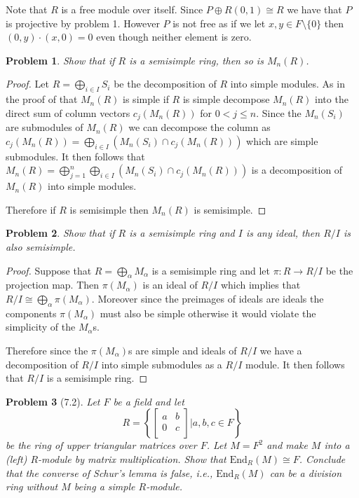 \documentclass[10pt]{article}
\newcommand{\sk}{\vskip 10mm}
\theoremstyle{plain}
\newtheorem{problem}{Problem}
\theoremstyle{remark}
\begin{document}
Note that $R$ is a free module over itself. Since $P\oplus R(0,1)\cong R$
we have that $P$ is projective by problem 1. However $P$ is
not free as if we let $x,y\in F\setminus\{0\}$ then $(0,y)\cdot(x,0)=0$ even
though neither element is zero.

\sk

\begin{problem}
  Show that if $R$ is a semisimple ring, then so is $M_n(R)$.
\end{problem}

\begin{proof}
  Let $R=\bigoplus_{i\in I}S_i$ be the decomposition of $R$ into simple modules.
  As in the proof of that $M_n(R)$ is simple if $R$ is simple decompose
  $M_n(R)$ into the direct sum of column vectors $c_j(M_n(R))$ for
  $0<j\leq n$. Since the $M_n(S_i)$ are submodules of $M_n(R)$ we can
  decompose the column as $c_j(M_n(R))=\bigoplus_{i\in I}(M_n(S_i)\cap c_j(M_n(R)))$
  which are simple submodules. It then follows that
  $M_n(R)=\bigoplus_{j=1}^n\bigoplus_{i\in I}(M_n(S_i)\cap c_j(M_n(R)))$ is a decomposition of
  $M_n(R)$ into simple modules.

  Therefore if $R$ is semisimple then $M_n(R)$ is semisimple.
\end{proof}

\sk

\begin{problem}
  Show that if $R$ is a semisimple ring and $I$ is any ideal, then $R/I$
  is also semisimple.
\end{problem}

\begin{proof}
  Suppose that $R=\bigoplus_\alpha M_\alpha$ is a semisimple ring and let $\pi:R\rightarrow R/I$ be the
  projection map. Then $\pi(M_\alpha)$ is an ideal of $R/I$ which implies that
  $R/I\cong \bigoplus_\alpha \pi(M_\alpha)$. Moreover since the preimages of ideals are ideals
  the components $\pi(M_\alpha)$ must also be simple otherwise it would violate
  the simplicity of the $M_\alpha$s.

  Therefore since the $\pi(M_\alpha)$s are simple and ideals of $R/I$ we have
  a decomposition of $R/I$ into simple submodules as a $R/I$ module.
  It then follows that $R/I$ is a semisimple ring.
\end{proof}

\sk

\begin{problem}[7.2]
  Let $F$ be a field and let
  \[
    R =
    \left\{
      \left[
        \begin{array}{cc}
          a&b\\
          0&c\\
        \end{array}
      \right]
      |
      a,b,c\in F
    \right\}
  \]
  be the ring of upper triangular matrices over $F$. Let $M=F^2$ and make
  $M$ into a (left) $R$-module by matrix multiplication. Show that
  $\text{End}_R(M)\cong F$. Conclude that the converse of Schur's lemma
  is false, i.e., $\text{End}_R(M)$ can be a division ring without
  $M$ being a simple $R$-module.
\end{problem}
\end{document}
